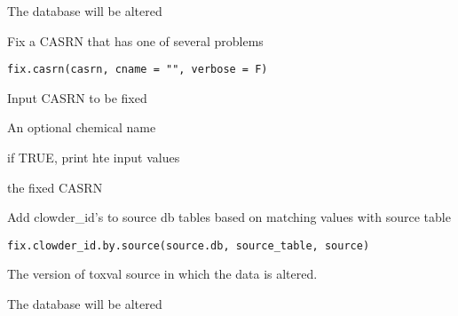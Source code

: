 \documentclass[letterpaper]{book}
\begin{document}
%
\begin{Value}
The database will be altered
\end{Value}
%
\begin{Description}\relax
Fix a CASRN that has one of several problems
\end{Description}
%
\begin{Usage}
\begin{verbatim}
fix.casrn(casrn, cname = "", verbose = F)
\end{verbatim}
\end{Usage}
%
\begin{Arguments}
\begin{ldescription}
\item[\code{casrn}] Input CASRN to be fixed

\item[\code{cname}] An optional chemical name

\item[\code{verbose}] if TRUE, print hte input values
\end{ldescription}
\end{Arguments}
%
\begin{Value}
the fixed CASRN
\end{Value}
%
\begin{Description}\relax
Add clowder\_id's to source db tables based on matching values with source table
\end{Description}
%
\begin{Usage}
\begin{verbatim}
fix.clowder_id.by.source(source.db, source_table, source)
\end{verbatim}
\end{Usage}
%
\begin{Arguments}
\begin{ldescription}
\item[\code{source.db}] The version of toxval source in which the data is altered.
\end{ldescription}
\end{Arguments}
%
\begin{Value}
The database will be altered
\end{Value}
\end{document}
